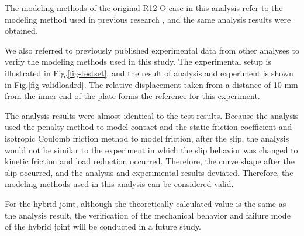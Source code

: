 The modeling methods of  the original R12-O case in this analysis refer to the modeling method used in previous research \cite{Peng2013FeaDimensions}, and the same analysis results were obtained.

We also referred to previously published experimental data \cite{peng2010} from other analyses to verify the modeling methods used in this study. The experimental setup is illustrated in Fig.\ref{fig-testset}, and the result of analysis and experiment is shown in Fig.\ref{fig-validloadrd}. The relative displacement taken from a distance of 10 mm from the inner end of the plate forms the reference for this experiment.

The analysis results were almost identical to the test results. Because the analysis used the penalty method to model contact and the static friction coefficient and isotropic Coulomb friction method to model friction, after the slip, the analysis would not be similar to the experiment in which the slip behavior was changed to kinetic friction and load reduction occurred. Therefore, the curve shape after the slip occurred, and the analysis and experimental results deviated. Therefore, the modeling methods used in this analysis can be considered valid.

For the hybrid joint, although the theoretically calculated value is the same as the analysis result, the verification of the mechanical behavior and failure mode of the hybrid joint will be conducted in a future study.

